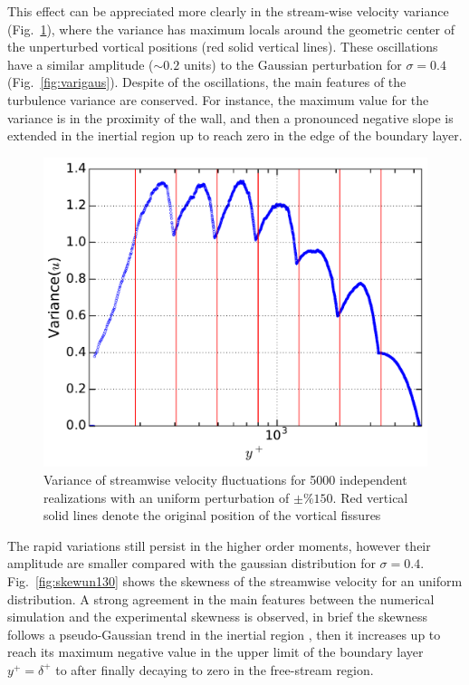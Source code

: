 \documentclass[aps,reprint,amsmath,amssymb,pra]{revtex4-1}%
\begin{document}
This effect can be appreciated more clearly in the stream-wise velocity variance (Fig.~\ref{fig:varun130}), where the variance has maximum locals around the geometric center of the unperturbed vortical positions (red solid vertical lines). These oscillations have a similar amplitude ($\sim 0.2$ units) to the Gaussian perturbation for $\sigma=0.4$ (Fig.~\ref{fig:varigaus}). Despite of the oscillations, the main features of the turbulence variance are conserved. For instance, the maximum value for the variance is in the proximity of the wall, and then a pronounced negative slope is extended in the inertial region up to reach zero in the edge of the boundary layer.\\
\begin{figure}[tbh]
\includegraphics[scale=0.46]{figures/variance_5000_assembles_un150}
\caption{\label{fig:varun130} Variance of streamwise velocity fluctuations for 5000 independent realizations with an uniform perturbation of $\pm \%150$. Red vertical solid lines denote the original position of the
vortical fissures}
\end{figure}     
The rapid variations still persist in the higher order moments, however their amplitude are smaller compared with the gaussian distribution for $\sigma=0.4$. Fig.~\ref{fig:skewun130} shows the skewness of the streamwise velocity for an uniform distribution. A strong agreement in the main features between the numerical simulation and the experimental skewness is observed, in brief the skewness follows a pseudo-Gaussian trend in the inertial region , then it increases up to reach its maximum negative value in the upper limit of the boundary layer $y^+=\delta^+$ to after finally decaying to zero in the free-stream region.
\end{document}

